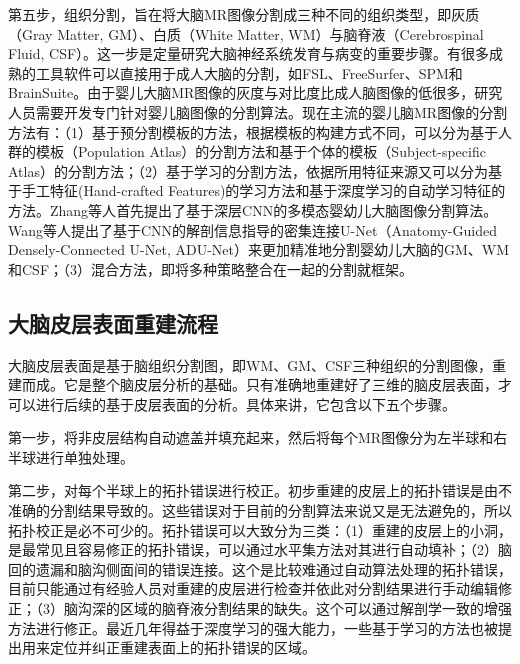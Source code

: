 第五步，组织分割，旨在将大脑MR图像分割成三种不同的组织类型，即灰质（Gray Matter, GM）、白质（White Matter, WM）与脑脊液（Cerebrospinal Fluid, CSF）。这一步是定量研究大脑神经系统发育与病变的重要步骤。有很多成熟的工具软件可以直接用于成人大脑的分割，如FSL\cite{jenkinson2012fsl}、FreeSurfer\cite{fischl2012freesurfer}、SPM\cite{tzourio2002automated}和BrainSuite\cite{shattuck2002brainsuite}。由于婴儿大脑MR图像的灰度与对比度比成人脑图像的低很多，研究人员需要开发专门针对婴儿脑图像的分割算法\cite{li2019computational}。现在主流的婴儿脑MR图像的分割方法有：（1）基于预分割模板的方法，根据模板的构建方式不同，可以分为基于人群的模板（Population Atlas）的分割方法\cite{shi2011infant,wang2014segmentation}和基于个体的模板（Subject-specific Atlas）的分割方法\cite{shi2010neonatal}；（2）基于学习的分割方法，依据所用特征来源又可以分为基于手工特征(Hand-crafted Features)的学习方法\cite{anbeek2013automatic,wang2015links}和基于深度学习的自动学习特征的方法\cite{wang2018volume,nie2016fully,zhang2015deep}。Zhang等人\cite{zhang2015deep}首先提出了基于深层CNN的多模态婴幼儿大脑图像分割算法。Wang等人\cite{wang2018volume}提出了基于CNN的解剖信息指导的密集连接U-Net\cite{ronneberger2015u}（Anatomy-Guided Densely-Connected U-Net, ADU-Net）\cite{wang2018volume}来更加精准地分割婴幼儿大脑的GM、WM和CSF；（3）混合方法，即将多种策略整合在一起的分割就框架\cite{beare2016neonatal,gui2012morphology}。


\subsection{大脑皮层表面重建流程}
大脑皮层表面是基于脑组织分割图，即WM、GM、CSF三种组织的分割图像，重建而成。它是整个脑皮层分析的基础。只有准确地重建好了三维的脑皮层表面，才可以进行后续的基于皮层表面的分析。具体来讲，它包含以下五个步骤。

第一步，将非皮层结构自动遮盖并填充起来，然后将每个MR图像分为左半球和右半球进行单独处理\cite{li2012consistent}。

第二步，对每个半球上的拓扑错误进行校正。初步重建的皮层上的拓扑错误是由不准确的分割结果导致的。这些错误对于目前的分割算法来说又是无法避免的，所以拓扑校正是必不可少的。拓扑错误可以大致分为三类：（1）重建的皮层上的小洞，是最常见且容易修正的拓扑错误，可以通过水平集方法\cite{han2003topology}对其进行自动填补；（2）脑回的遗漏和脑沟侧面间的错误连接。这个是比较难通过自动算法处理的拓扑错误，目前只能通过有经验人员对重建的皮层进行检查并依此对分割结果进行手动编辑修正；（3）脑沟深的区域的脑脊液分割结果的缺失。这个可以通过解剖学一致的增强方法\cite{han2004cruise}进行修正。最近几年得益于深度学习的强大能力，一些基于学习的方法也被提出用来定位并纠正重建表面上的拓扑错误的区域\cite{hao2016learning,sun2019topological}。

